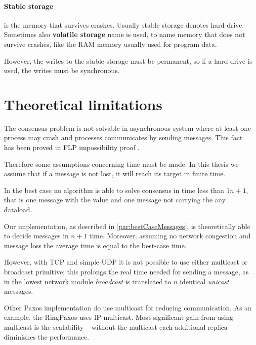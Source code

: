 \paragraph{Stable storage}
is the memory that survives crashes. Usually stable storage denotes hard drive.
Sometimes also \textbf{volatile storage} name is used, to name memory that does not survive crashes, like the RAM memory usually used for program data.

\noindent However, the writes to the stable storage must be permanent, so if a hard drive is used, the writes must be synchronous.

\section{Theoretical limitations}


The consensus problem is not solvable in asynchronous system where at least one process may crash and processes communicates by sending messages. This fact has been proved in FLP impossibility proof \cite{FLP}.

Therefore some assumptions concerning time must be made. In this thesis we assume that if a message is not lost, it will reach its target in finite time.


In the best case no algorithm is able to solve consensus in time less than $1n+1$, that is one message with the value and one message not carrying the any dataload.

Our implementation, as described in \ref{par:bestCaseMessages}, is theoretically able to decide messages in $n+1$ time. Moreover, assuming no network congestion and message loss the average time is equal to the best-case time.

However, with TCP and simple UDP it is not possible to use either multicast or broadcast primitive; this prolongs the real time needed for sending a message, as in the lowest network module \emph{broadcast} is translated to $n$ identical \textit{unicast} messages.

Other Paxos implementation do use multicast for reducing communication. As an example, the RingPaxos \cite{Mar10} uses IP multicast. Most significant gain from using multicast is the scalability -- without the multicast each additional replica diminishes the performance.

